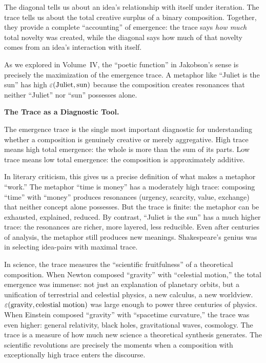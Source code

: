 \begin{interpretation}
The diagonal tells us about an idea's relationship with itself under iteration.
The trace tells us about the total creative surplus of a binary composition.
Together, they provide a complete ``accounting'' of emergence: the trace says
\emph{how much} total novelty was created, while the diagonal says how much of
that novelty comes from an idea's interaction with itself.

As we explored in Volume~IV, the ``poetic function'' in Jakobson's sense is
precisely the maximization of the emergence trace. A metaphor like ``Juliet is
the sun'' has high $\varepsilon(\text{Juliet}, \text{sun})$ because the composition
creates resonances that neither ``Juliet'' nor ``sun'' possesses alone.

\textbf{The Trace as a Diagnostic Tool.}

The emergence trace is the single most important diagnostic for understanding
whether a composition is genuinely creative or merely aggregative. High trace
means high total emergence: the whole is more than the sum of its parts. Low
trace means low total emergence: the composition is approximately additive.

In literary criticism, this gives us a precise definition of what makes a metaphor
``work.'' The metaphor ``time is money'' has a moderately high trace: composing
``time'' with ``money'' produces resonances (urgency, scarcity, value, exchange)
that neither concept alone possesses. But the trace is finite: the metaphor can
be exhausted, explained, reduced. By contrast, ``Juliet is the sun'' has a much
higher trace: the resonances are richer, more layered, less reducible. Even after
centuries of analysis, the metaphor still produces new meanings. Shakespeare's
genius was in selecting idea-pairs with maximal trace.

In science, the trace measures the ``scientific fruitfulness'' of a theoretical
composition. When Newton composed ``gravity'' with ``celestial motion,'' the
total emergence was immense: not just an explanation of planetary orbits, but a
unification of terrestrial and celestial physics, a new calculus, a new worldview.
$\varepsilon(\text{gravity}, \text{celestial motion})$ was large enough to power
three centuries of physics. When Einstein composed ``gravity'' with ``spacetime
curvature,'' the trace was even higher: general relativity, black holes,
gravitational waves, cosmology. The trace is a measure of how much new science
a theoretical synthesis generates. The scientific revolutions are precisely the
moments when a composition with exceptionally high trace enters the discourse.


\end{interpretation}
